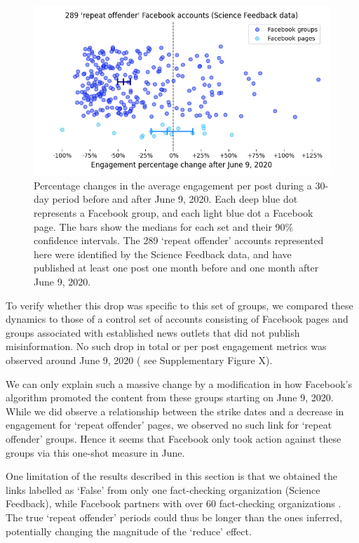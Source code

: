 \documentclass[review]{elsarticle}
\begin{document}
\begin{figure}[!h]
\centering
\includegraphics[scale=0.5]{./../figure/sf_june_drop_percentage_change.png}
\caption{
Percentage changes in the average engagement per post during a 30-day period before and after June 9, 2020. 
Each deep blue dot represents a Facebook group, and each light blue dot a Facebook page.
The bars show the medians for each set and their $90\%$ confidence intervals.
The 289 `repeat offender' accounts represented here were identified by the Science Feedback data, and have published at least one post one month before and one month after June 9, 2020.
}
\label{repeat_june_drop_percentage_change}
\end{figure}

To verify whether this drop was specific to this set of groups, we compared these dynamics to those of a control set of accounts consisting of Facebook pages and groups associated with established news outlets that did not publish misinformation.
No such drop in total or per post engagement metrics was observed around June 9, 2020 ({\color{red} see Supplementary Figure X}).

We can only explain such a massive change by a modification in how Facebook’s algorithm promoted the content from these groups starting on June 9, 2020.
While we did observe a relationship between the strike dates and a decrease in engagement for `repeat offender' pages, we observed no such link for `repeat offender' groups.
Hence it seems that Facebook only took action against these groups via this one-shot measure in June.

One limitation of the results described in this section is that we obtained the links labelled as `False' from only one fact-checking organization (Science Feedback), while Facebook partners with over 60 fact-checking organizations \citep{60factCheckingPartners}.
The true `repeat offender' periods could thus be longer than the ones inferred, potentially changing the magnitude of the ‘reduce’ effect.
\end{document}
